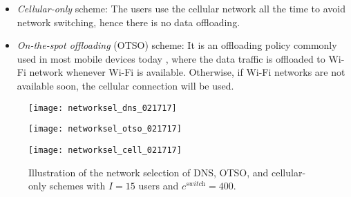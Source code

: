\documentclass[journal]{IEEEtran}
\begin{document}
\begin{itemize}
	\item \emph{Cellular-only} scheme: The users use the cellular network all the time to avoid network switching, hence there is no data offloading.
	
	\item \emph{On-the-spot offloading} (OTSO) scheme: It is an offloading policy commonly used in most mobile devices today \cite{rayment_ac12}, where the data traffic is offloaded to Wi-Fi network whenever Wi-Fi is available. 
	Otherwise, if Wi-Fi networks are not available soon, the cellular connection will be used. 
	
\end{itemize}
	


\begin{figure*}[t]
\hspace{-0.5cm}
\centering
%
\begin{minipage}[t]{0.3\linewidth}
       \texttt{[image: networksel\_dns\_021717]}
   \label{fig:networksel_dns}
\end{minipage}
% 
\quad
%
\begin{minipage}[t]{0.3\linewidth}
       \texttt{[image: networksel\_otso\_021717]}
   \label{fig:networksel_otso}
\end{minipage}
%
\quad
%
\begin{minipage}[t]{0.3\linewidth}
       \texttt{[image: networksel\_cell\_021717]} 
   \label{fig:networksel_cell}
\end{minipage}	
%
\vspace{-0.2cm}
\caption{Illustration of the network selection of DNS, OTSO, and cellular-only schemes with $I = 15$ users and $c^{\textit{switch}} = 400$.}
\label{fig:networksel}
\end{figure*} 
\end{document}
